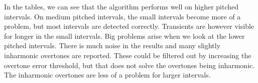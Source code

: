 \documentclass[10pt,twocolumn]{article}
\begin{document}
In the tables, we can see that the algorithm performs well on higher pitched intervals. On medium pitched intervals, the small intervals become more of a problem, but most intervals are detected correctly. Transients are however visible for longer in the small intervals. Big problems arise when we look at the lower pitched intervals. There is much noise in the results and many slightly inharmonic overtones are reported. These could be filtered out by increasing the overtone error threshold, but that does not solve the overtones being inharmonic. The inharmonic overtones are less of a problem for larger intervals.
%
%
\end{document}
